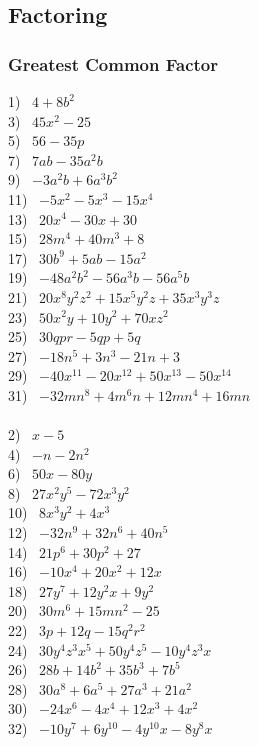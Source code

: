 \newpage

\subsection{Factoring}

\subsubsection{Greatest Common Factor}

{}

\begin{multicols}{2}
  1)~ $4 + 8 b^2$\\
  3)~ $45 x^2 - 25$\\
  5)~ $56 - 35 p$\\
  7)~ $7 ab - 35 a^2 b$\\
  9)~ $- 3 a^2 b + 6 a^3 b^2$\\
  11)~ $- 5 x^2 - 5 x^3 - 15 x^4$\\
  13)~ $20 x^4 - 30 x + 30$\\
  15)~ $28 m^4 + 40 m^3 + 8$\\
  17)~ $30 b^9 + 5 a b - 15 a^2$\\
  19)~ $- 48 a^2 b^2 - 56 a^3 b - 56 a^5 b$\\
  21)~ $20 x^8 y^2 z^2 + 15 x^5 y^2 z + 35 x^3 y^3 z$\\
  23)~ $50 x^2 y + 10 y^2 + 70 x z^2$\\
  25)~ $30 q p r - 5 q p + 5 q$\\
  27)~ $- 18 n^5 + 3 n^3 - 21 n + 3$\\
  29)~ $- 40 x^{11} - 20 x^{12} + 50 x^{13} - 50 x^{14}$\\
  31)~ $- 32 m n^8 + 4 m^6 n + 12 m n^4 + 16 m n$\\
~\\
  2)~ $x - 5$\\
  4)~ $-n - 2 n^2$\\
  6)~ $50 x - 80 y$\\
  8)~ $27 x^2 y^5 - 72 x^3 y^2$\\
  10)~ $8 x^3 y^2 + 4 x^3$\\
  12)~ $- 32 n^9 + 32 n^6 + 40 n^5$\\
  14)~ $21 p^6 + 30 p^2 + 27$\\
  16)~ $- 10 x^4 + 20 x^2 + 12 x$\\
  18)~ $27 y^7 + 12 y^2 x + 9 y^2$\\
  20)~ $30 m^6 + 15 m n^2 - 25$\\
  22)~ $3 p + 12 q - 15 q^2 r^2$\\
  24)~ $30 y^4 z^3 x^5 + 50 y^4 z^5 - 10 y^4 z^3 x$\\
  26)~ $28 b + 14 b^2 + 35 b^3 + 7 b^5$\\
  28)~ $30 a^8 + 6 a^5 + 27 a^3 + 21 a^2$\\
  30)~ $- 24 x^6 - 4 x^4 + 12 x^3 + 4 x^2$\\
  32)~ $- 10 y^7 + 6 y^{10} - 4 y^{10} x - 8 y^8 x$
\end{multicols}

